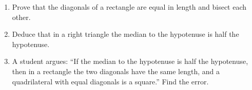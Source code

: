 \begin{enumerate}
\item[(a)] Prove that the diagonals of a rectangle are equal in length and bisect each other.
\item[(b)] Deduce that in a right triangle the median to the hypotenuse is half the hypotenuse.
\item[(c)] A student argues: ``If the median to the hypotenuse is half the hypotenuse, then in a rectangle the two diagonals have the same length, and a quadrilateral with equal diagonals is a square.'' Find the error.
\end{enumerate}
